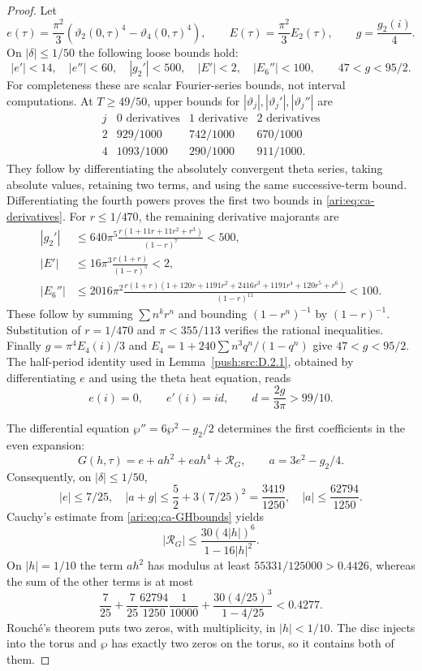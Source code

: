\begin{proof}
Let
\[
 e(\tau)=\frac{\pi^2}{3}(\vartheta_2(0,\tau)^4-
                              \vartheta_4(0,\tau)^4),\qquad
 E(\tau)=\frac{\pi^2}{3}E_2(\tau),\qquad
 g=\frac{g_2(i)}4.
\]
On $|\delta|\le1/50$ the following loose bounds hold:
\begin{equation}\label{ari:eq:ca-derivatives}
 |e'|<14,\quad |e''|<60,\quad |g_2'|<500,
 \quad |E'|<2,\quad |E_6''|<100,
 \qquad 47<g<95/2.
\end{equation}
For completeness these are scalar Fourier-series bounds, not
interval computations. At $T\ge49/50$, upper bounds for
$|\vartheta_j|,|\vartheta_j'|,|\vartheta_j''|$ are
\[
\begin{array}{c|ccc}
j&0\text{ derivatives}&1\text{ derivative}&2\text{ derivatives}\\ \hline
2&929/1000&742/1000&670/1000\\
4&1093/1000&290/1000&911/1000.
\end{array}
\]
They follow by differentiating the absolutely convergent theta
series, taking absolute values, retaining two terms, and using
the same successive-term bound. Differentiating the fourth
powers proves the first two bounds in \eqref{ari:eq:ca-derivatives}.
For $r\le1/470$, the remaining derivative majorants are
\begin{align*}
 |g_2'|&\le640\pi^5\frac{r(1+11r+11r^2+r^3)}{(1-r)^7}<500,\\
 |E'|&\le16\pi^3\frac{r(1+r)}{(1-r)^5}<2,\\
 |E_6''|&\le2016\pi^2
 \frac{r(1+r)(1+120r+1191r^2+2416r^3+1191r^4+120r^5+r^6)}
 {(1-r)^{11}}<100.
\end{align*}
These follow by summing $\sum n^k r^n$ and bounding
$(1-r^n)^{-1}$ by $(1-r)^{-1}$. Substitution of $r=1/470$
and $\pi<355/113$ verifies the rational inequalities.
Finally $g=\pi^4E_4(i)/3$ and
$E_4=1+240\sum n^3q^n/(1-q^n)$ give $47<g<95/2$.
The half-period identity used in Lemma~\ref{push:src:D.2.1},
obtained by differentiating $e$ and using the theta heat equation, reads
\[
 e(i)=0,\qquad e'(i)=id,\qquad d=\frac{2g}{3\pi}>99/10.
\]

The differential equation $\wp''=6\wp^2-g_2/2$ determines the
first coefficients in the even expansion:
\[
 G(h,\tau)=e+a h^2+ea h^4+\mathcal R_G,
 \qquad a=3e^2-g_2/4.
\]
Consequently, on $|\delta|\le1/50$,
\[
 |e|\le7/25,\quad |a+g|\le\frac52+3(7/25)^2=\frac{3419}{1250},
 \quad |a|\le\frac{62794}{1250}.
\]
Cauchy's estimate from \eqref{ari:eq:ca-GHbounds} yields
\[
 |\mathcal R_G|\le
 \frac{30(4|h|)^6}{1-16|h|^2}.
\]
On $|h|=1/10$ the term $ah^2$ has modulus at least
$55331/125000>0.4426$, whereas the sum of the other terms is at most
\[
 \frac7{25}+\frac7{25}\frac{62794}{1250}\frac1{10000}
       +\frac{30(4/25)^3}{1-4/25}<0.4277.
\]
Rouch\'e's theorem puts two zeros, with multiplicity, in
$|h|<1/10$. The disc injects into the torus and $\wp$ has exactly
two zeros on the torus, so it contains both of them.


\end{proof}
